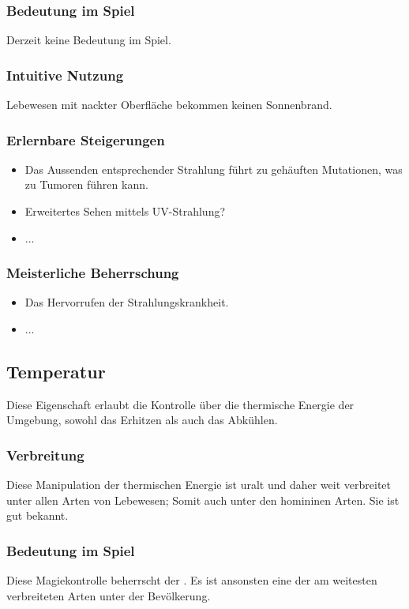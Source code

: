 \subsubsection{Bedeutung im Spiel}
Derzeit keine Bedeutung im Spiel.

\subsubsection{Intuitive Nutzung}
Lebewesen mit nackter Oberfläche bekommen keinen Sonnenbrand.

\subsubsection{Erlernbare Steigerungen}
\begin{itemize}
	\item Das Aussenden entsprechender Strahlung führt zu gehäuften Mutationen, was zu Tumoren führen kann.
	\item Erweitertes Sehen mittels UV-Strahlung?
	\item ...
\end{itemize}

\subsubsection{Meisterliche Beherrschung} 
\begin{itemize}
	\item Das Hervorrufen der Strahlungskrankheit.
	\item ...
\end{itemize}



\subsection{Temperatur}\label{sec:temperaturmagie}
Diese Eigenschaft erlaubt die Kontrolle über die thermische Energie der Umgebung, sowohl das Erhitzen als auch das Abkühlen.

\subsubsection{Verbreitung}
Diese Manipulation der thermischen Energie ist uralt und daher weit verbreitet unter allen Arten von Lebewesen; Somit auch unter den homininen Arten. Sie ist gut bekannt.

\subsubsection{Bedeutung im Spiel}
Diese Magiekontrolle beherrscht der . Es ist ansonsten eine der am weitesten verbreiteten Arten unter der Bevölkerung.

